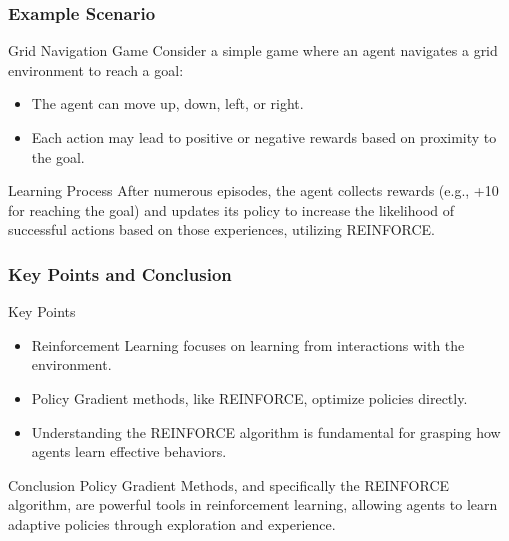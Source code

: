 \documentclass{beamer}
\begin{document}
\begin{frame}[fragile]
    \frametitle{Example Scenario}

    \begin{block}{Grid Navigation Game}
        Consider a simple game where an agent navigates a grid environment to reach a goal:
        \begin{itemize}
            \item The agent can move up, down, left, or right.
            \item Each action may lead to positive or negative rewards based on proximity to the goal.
        \end{itemize}
    \end{block}

    \begin{block}{Learning Process}
        After numerous episodes, the agent collects rewards (e.g., +10 for reaching the goal) and updates its policy to increase the likelihood of successful actions based on those experiences, utilizing REINFORCE.
    \end{block}
\end{frame}

\begin{frame}[fragile]
    \frametitle{Key Points and Conclusion}

    \begin{block}{Key Points}
        \begin{itemize}
            \item Reinforcement Learning focuses on learning from interactions with the environment.
            \item Policy Gradient methods, like REINFORCE, optimize policies directly.
            \item Understanding the REINFORCE algorithm is fundamental for grasping how agents learn effective behaviors.
        \end{itemize}
    \end{block}

    \begin{block}{Conclusion}
        Policy Gradient Methods, and specifically the REINFORCE algorithm, are powerful tools in reinforcement learning, allowing agents to learn adaptive policies through exploration and experience.
    \end{block}
\end{frame}
\end{document}
